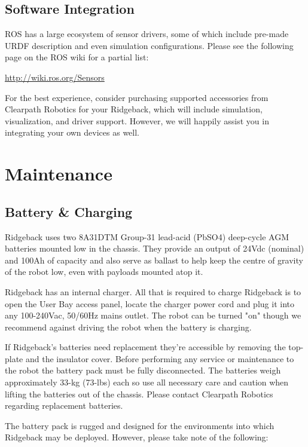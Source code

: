 \documentclass[]{clearpath-latex/clearpath-manual}
\begin{document}
\subsection{Software Integration}

ROS has a large ecosystem of sensor drivers, some of which include pre-made URDF description and even simulation configurations.  Please see the following page on the ROS wiki for a partial list:

\url{http://wiki.ros.org/Sensors }

For the best experience, consider purchasing supported accessories from Clearpath Robotics for your Ridgeback, which will include simulation, visualization, and driver support.  However, we will happily assist you in integrating your own devices as well.

\section{Maintenance}

\subsection{Battery \& Charging}

Ridgeback uses two 8A31DTM Group-31 lead-acid (PbSO4) deep-cycle AGM batteries mounted low in the chassis. They provide an output of 24Vdc (nominal) and 100Ah of capacity and also serve as ballast to help keep the centre of gravity of the robot low, even with payloads mounted atop it.

Ridgeback has an internal charger. All that is required to charge Ridgeback is to open the User Bay access panel, locate the charger power cord and plug it into any 100-240Vac, 50/60Hz mains outlet. The robot can be turned "on" though we recommend against driving the robot when the battery is charging.

If Ridgeback's batteries need replacement they're accessible by removing the top-plate and the insulator cover. Before performing any service or maintenance to the robot the battery pack must be fully disconnected. The batteries weigh approximately 33-kg (73-lbs) each so use all necessary care and caution when lifting the batteries out of the chassis. Please contact Clearpath Robotics regarding replacement batteries.

The battery pack is rugged and designed for the environments into which Ridgeback may be deployed. However, please take note of the following:
\end{document}
